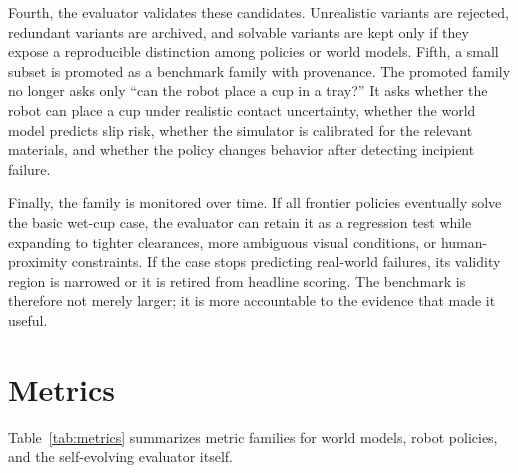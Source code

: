 \documentclass[sigconf,review,anonymous]{acmart}
\begin{document}
Fourth, the evaluator validates these candidates. Unrealistic variants are rejected, redundant variants are archived, and solvable variants are kept only if they expose a reproducible distinction among policies or world models. Fifth, a small subset is promoted as a benchmark family with provenance. The promoted family no longer asks only ``can the robot place a cup in a tray?'' It asks whether the robot can place a cup under realistic contact uncertainty, whether the world model predicts slip risk, whether the simulator is calibrated for the relevant materials, and whether the policy changes behavior after detecting incipient failure.

Finally, the family is monitored over time. If all frontier policies eventually solve the basic wet-cup case, the evaluator can retain it as a regression test while expanding to tighter clearances, more ambiguous visual conditions, or human-proximity constraints. If the case stops predicting real-world failures, its validity region is narrowed or it is retired from headline scoring. The benchmark is therefore not merely larger; it is more accountable to the evidence that made it useful.

\section{Metrics}

Table~\ref{tab:metrics} summarizes metric families for world models, robot policies, and the self-evolving evaluator itself.
\end{document}
